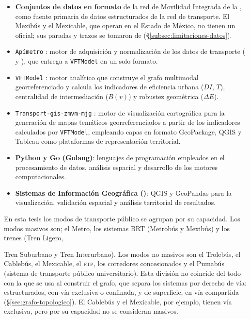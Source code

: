 \begin{itemize}
\item \textbf{Conjuntos de datos en formato \gtfs{}} de la red de Movilidad Integrada de la \cdmx{},
    como fuente primaria de datos estructurados de la red de transporte. El
    Mexibús y el Mexicable, que operan en el Estado de México, no tienen un
    \gtfs{} oficial; sus paradas y trazos se tomaron de 
    \citep{osm2012} (§\ref{subsec:limitaciones-datos}).
\item \texttt{Apímetro} \citep{cabrera2025apimetro}: motor de adquisición y
    normalización de los datos de transporte (\gtfs{} y ),
    que entrega a \texttt{VFTModel} en un solo formato.
\item \texttt{VFTModel} \citep{cabrera2026VFTModel}: motor analítico que
    construye el grafo multimodal georreferenciado y calcula  los
    indicadores de eficiencia urbana ($DI$, $T$), centralidad de
    intermediación ($B(v)$) y robustez geométrica ($\Delta E$).
\item \texttt{Transport-gis-zmvm-mjg} \citep{cabrera2026transportgis}: motor de
    visualización cartográfica para la generación de mapas temáticos
    georreferenciados a partir de los indicadores calculados por
    \texttt{VFTModel}, empleando capas \gis{} en formato GeoPackage,
    QGIS y Tableau como plataformas de representación territorial.
\item \textbf{Python y Go (Golang)}: lenguajes de programación empleados en el
    procesamiento de datos, análisis espacial y desarrollo de los motores
    computacionales.
\item \textbf{Sistemas de Información Geográfica (\gis{})}: QGIS y GeoPandas
    para la visualización, validación espacial y análisis territorial de resultados.
\end{itemize}

En esta tesis los modos de transporte público se agrupan por su capacidad. 
Los modos masivos son; el Metro, los sistemas BRT
 (Metrobús y Mexibús) y los trenes (Tren Ligero,

 Tren Suburbano y Tren Interurbano). Los modos no masivos son el 
 Trolebús, el Cablebús, el
Mexicable, el \textsc{rtp}, los corredores concesionados y el Pumabús 
(sistema de transporte público universitario). Esta
división no coincide del todo con la que se usa al construir el grafo, que
separa los sistemas por derecho de vía: estructurados, con vía exclusiva o
confinada, y de superficie, en vía compartida (§\ref{sec:grafo-topologico}). El
Cablebús y el Mexicable, por ejemplo, tienen vía exclusiva, pero por su capacidad 
no se consideran masivos.

